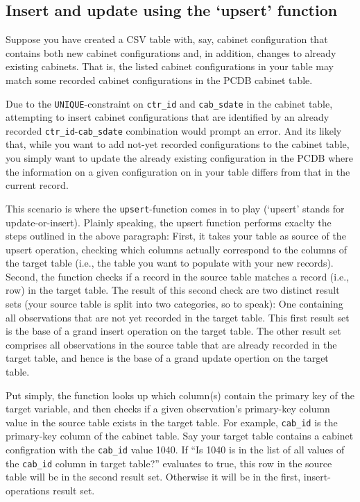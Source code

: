 \subsection{Insert and update using the `upsert' function}\label{subsec_upsert_data_function}

Suppose you have created a CSV table with, say, cabinet configuration that contains both new cabinet configurations and, in addition, changes to already existing cabinets. That is, the listed cabinet configurations in your table may match some recorded cabinet configurations in the PCDB cabinet table. 

Due to the \texttt{UNIQUE}-constraint on \texttt{ctr\_id} and \texttt{cab\_sdate} in the cabinet table, attempting to insert cabinet configurations that are identified by an already recorded \texttt{ctr\_id}-\texttt{cab\_sdate} combination would prompt an error. 
And its likely that, while you want to add not-yet recorded configurations to the cabinet table, you simply want to update the already existing configuration in the PCDB where the information on a given configuration on in your table differs from that in the current record.

This scenario is where the \texttt{upsert}-function comes in to play (`upsert' stands for update-or-insert).
Plainly speaking, the upsert function performs exaclty the steps outlined in the above paragraph: 
First, it takes your table as source of the upsert operation, checking which columns actually correspond to the columns of the target table (i.e., the table you want to populate with your new records). 
Second, the function checks if a record in the source table matches a record (i.e., row) in the target table.
The result of this second check are two distinct result sets (your source table is split into two categories, so to speak): One containing all observations that are not yet recorded in the target table. This first result set is the base of a grand insert operation on the target table.
The other result set comprises all observations in the source table that are already recorded in the target table, and hence is the base of a grand update opertion on the target table. 

Put simply, the function looks up which column(s) contain the primary key of the target variable, and then checks if a given observation's primary-key column value in the source table exists in the target table. 
For example, \texttt{cab\_id} is the primary-key column of the cabinet table. Say your target table contains a cabinet configration with the \texttt{cab\_id} value 1040.
If ``Is 1040 is in the list of all values of the \texttt{cab\_id} column in target table?'' evaluates to true, this row in the source table will be in the second result set. Otherwise it will be in the first, insert-operations result set.





